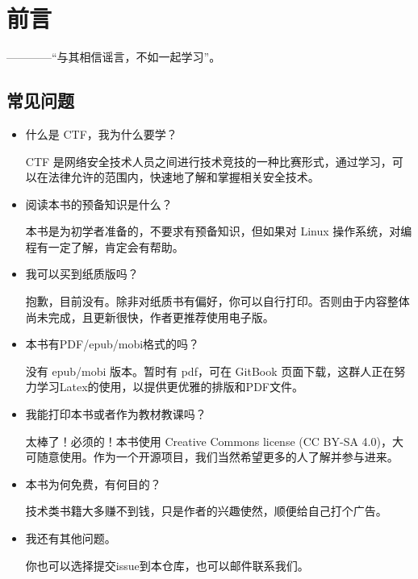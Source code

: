 \chapter{前言}

————“与其相信谣言，不如一起学习”。

\section{常见问题}

\begin{itemize}\setlength{\parindent}{2em}
    \item 什么是 CTF，我为什么要学？
    
    CTF 是网络安全技术人员之间进行技术竞技的一种比赛形式，通过学习，可以在法律允许的范围内，快速地了解和掌握相关安全技术。

    \item 阅读本书的预备知识是什么？
    
    本书是为初学者准备的，不要求有预备知识，但如果对 Linux 操作系统，对编程有一定了解，肯定会有帮助。

    \item 我可以买到纸质版吗？
    
    抱歉，目前没有。除非对纸质书有偏好，你可以自行打印。否则由于内容整体尚未完成，且更新很快，作者更推荐使用电子版。
    
    \item 本书有PDF/epub/mobi格式的吗？
    
    没有 epub/mobi 版本。暂时有 pdf，可在 GitBook 页面下载，这群人正在努力学习Latex的使用，以提供更优雅的排版和PDF文件。
    
    \item 我能打印本书或者作为教材教课吗？
    
    太棒了！必须的！本书使用 Creative Commons license (CC BY-SA 4.0)，大可随意使用。作为一个开源项目，我们当然希望更多的人了解并参与进来。
    
    \item 本书为何免费，有何目的？
    
    技术类书籍大多赚不到钱，只是作者的兴趣使然，顺便给自己打个广告。
    
    \item 我还有其他问题。
    
    你也可以选择提交issue到本仓库，也可以邮件联系我们。
    
\end{itemize}
